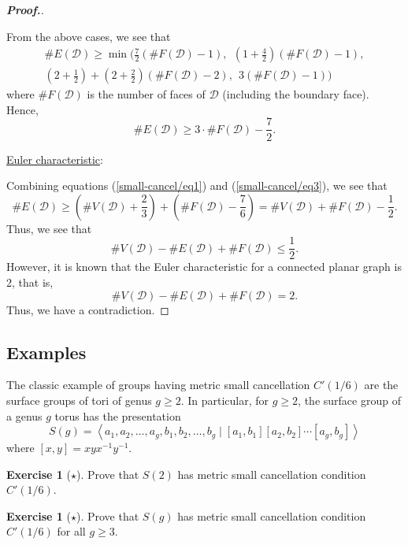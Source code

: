 \documentclass[11pt,a4paper,reqno]{amsart}
\theoremstyle{plain}
\theoremstyle{definition}
\theoremstyle{definition}
\newtheorem{exercise}[theorem]{Exercise}
\renewcommand\leq\leqslant
\renewcommand\geq\geqslant
\newenvironment{myproof}{\begin{proof}[\normalfont\bfseries Proof.]}{\end{proof}}
\newcommand\exerciseLevelEasy{$\star$}
\begin{document}
\begin{myproof}
\begin{enumerate}[label=(\roman*),ref=\roman*]
\end{enumerate}
\noindent
From the above cases, we see that
\begin{multline}\label{small-cancel/eq2}
  \#E(\mathcal D) \geq 
    \min\Bigg(
            \frac{7}{2}\left( \#F(\mathcal D) - 1 \right),\ \ 
            \left(1 + \frac{4}{2}\right)\left( \#F(\mathcal D) - 1 \right),\\
            \left(2 +\frac{1}{2}\right)+ \left(2 + \frac{2}{2}\right)\left( \#F(\mathcal D) - 2 \right),\ \ 
            3\left( \#F(\mathcal D) - 1 \right)
  \Bigg)
\end{multline}
where $\#F(\mathcal D)$ is the number of faces of $\mathcal D$ (including the boundary face).
Hence,
\begin{equation}\label{small-cancel/eq3}
  \#E(\mathcal D) \geq 
  3 \cdot \#F(\mathcal D) - \frac{7}{2}.
\end{equation}

\medskip
\noindent
\underline{Euler characteristic}:\nopagebreak

\smallskip\nopagebreak
\noindent\nopagebreak
Combining equations (\ref{small-cancel/eq1}) and (\ref{small-cancel/eq3}), we see that
\[
  \#E(\mathcal D)
  \geq
  \left(\#V(\mathcal D) + \frac{2}{3}\right)
  +
  \left(\#F(\mathcal D) - \frac{7}{6}\right)
  =
  \#V(\mathcal D) + \#F(\mathcal D) - \frac{1}{2}.
\]
Thus, we see that
\[
  \#V(\mathcal D) - \#E(\mathcal D) + \#F(\mathcal D)\leq \frac{1}{2}.
\]
However, it is known that the Euler characteristic for a connected planar graph is 2, that is,
\[\#V(\mathcal D) - \#E(\mathcal D) + \#F(\mathcal D)=2.\]
Thus, we have a contradiction.
\end{myproof}

\subsection{Examples}
The classic example of groups having metric small cancellation $C'(1/6)$ are the surface groups of tori of genus $g\geq 2$.
In particular, for $g\geq 2$, the surface group of a genus $g$ torus has the presentation
\[
  S(g)
  =
  \left\langle
    a_1, a_2,\ldots, a_g,
    b_1, b_2,\ldots, b_g
  \mid
    [a_1, b_1][a_2,b_2]\cdots [a_g, b_g]
  \right\rangle
\]
where $[x,y] = xyx^{-1}y^{-1}$.

\begin{exercise}[\exerciseLevelEasy]
  Prove that $S(2)$ has metric small cancellation condition $C'(1/6)$.
\end{exercise}
\begin{exercise}[\exerciseLevelEasy]
  Prove that $S(g)$ has metric small cancellation condition $C'(1/6)$ for all $g\geq 3$.
\end{exercise}
\end{document}
